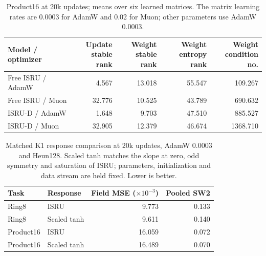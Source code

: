 \begin{table}[H]
\centering\small
\begin{tabular}{@{}lrrrr@{}}
\toprule
Model / optimizer & \shortstack{Update\\stable rank} & \shortstack{Weight\\stable rank} & \shortstack{Weight\\entropy rank} & \shortstack{Weight\\condition no.}\\
\midrule
Free ISRU / AdamW & 4.567 & 13.018 & 55.547 & 109.267\\
Free ISRU / Muon & 32.776 & 10.525 & 43.789 & 690.632\\
ISRU-D / AdamW & 1.648 & 9.703 & 47.510 & 885.527\\
ISRU-D / Muon & 32.905 & 12.379 & 46.674 & 1368.710\\
\bottomrule
\end{tabular}
\caption{Product16 at 20k updates; means over six learned matrices. The matrix learning rates are 0.0003 for AdamW and 0.02 for Muon; other parameters use AdamW 0.0003.}
\label{tab:ranks}
\end{table}
\begin{table}[H]
\centering\small
\begin{tabular}{@{}llrr@{}}
\toprule
Task & Response & Field MSE ($\times10^{-3}$) & Pooled SW2\\
\midrule
Ring8 & ISRU & 9.773 & 0.133\\
Ring8 & Scaled tanh & 9.611 & 0.140\\
Product16 & ISRU & 16.059 & 0.072\\
Product16 & Scaled tanh & 16.489 & 0.070\\
\bottomrule
\end{tabular}
\caption{Matched K1 response comparison at 20k updates, AdamW 0.0003 and Heun128. Scaled tanh matches the slope at zero, odd symmetry and saturation of ISRU; parameters, initialization and data stream are held fixed. Lower is better.}
\label{tab:response}
\end{table}
